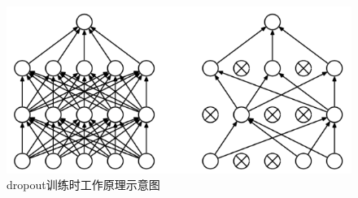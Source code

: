 \begin{figure}[htb]
\centering
\includegraphics[scale=0.5]{../figures/dropout.png}
\caption{dropout训练时工作原理示意图}
\label{fig:bp10}
\end{figure}

